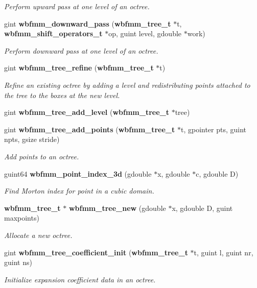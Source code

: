 \begin{DoxyCompactItemize}
\begin{DoxyCompactList}\small\item\em Perform upward pass at one level of an octree. \end{DoxyCompactList}\item 
gint {\bf wbfmm\+\_\+downward\+\_\+pass} ({\bf wbfmm\+\_\+tree\+\_\+t} $\ast$t, {\bf wbfmm\+\_\+shift\+\_\+operators\+\_\+t} $\ast$op, guint level, gdouble $\ast$work)
\begin{DoxyCompactList}\small\item\em Perform downward pass at one level of an octree. \end{DoxyCompactList}\item 
gint {\bf wbfmm\+\_\+tree\+\_\+refine} ({\bf wbfmm\+\_\+tree\+\_\+t} $\ast$t)
\begin{DoxyCompactList}\small\item\em Refine an existing octree by adding a level and redistributing points attached to the tree to the boxes at the new level. \end{DoxyCompactList}\item 
gint {\bf wbfmm\+\_\+tree\+\_\+add\+\_\+level} ({\bf wbfmm\+\_\+tree\+\_\+t} $\ast$tree)
\item 
gint {\bf wbfmm\+\_\+tree\+\_\+add\+\_\+points} ({\bf wbfmm\+\_\+tree\+\_\+t} $\ast$t, gpointer pts, guint npts, gsize stride)
\begin{DoxyCompactList}\small\item\em Add points to an octree. \end{DoxyCompactList}\item 
guint64 {\bf wbfmm\+\_\+point\+\_\+index\+\_\+3d} (gdouble $\ast$x, gdouble $\ast$c, gdouble D)
\begin{DoxyCompactList}\small\item\em Find Morton index for point in a cubic domain. \end{DoxyCompactList}\item 
{\bf wbfmm\+\_\+tree\+\_\+t} $\ast$ {\bf wbfmm\+\_\+tree\+\_\+new} (gdouble $\ast$x, gdouble D, guint maxpoints)
\begin{DoxyCompactList}\small\item\em Allocate a new octree. \end{DoxyCompactList}\item 
gint {\bf wbfmm\+\_\+tree\+\_\+coefficient\+\_\+init} ({\bf wbfmm\+\_\+tree\+\_\+t} $\ast$t, guint l, guint nr, guint ns)
\begin{DoxyCompactList}\small\item\em Initialize expansion coefficient data in an octree. \end{DoxyCompactList}\item 

\end{DoxyCompactItemize}
